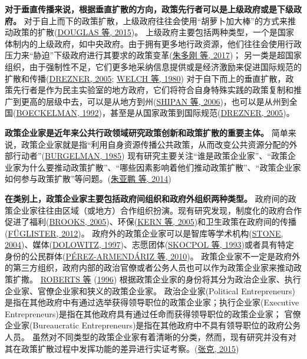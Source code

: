 \documentclass[
  12pt,
]{ctexart}
\begin{document}
\textbf{对于垂直传播来说，根据垂直扩散的方向，政策先行者可以是上级政府或是下级政府。}
对于自上而下的政策扩散，上级政府往往会使用``胡萝卜加大棒''的方式来推动政策的扩散(\protect\hyperlink{ref-DouglasEtAl2015}{DOUGLAS 等, 2015})。
上级政府主要包括两种类型，一个是国家体制内的上级政府，如中央政府。由于拥有更多地行政资源，他们往往会使用行政压力来``胁迫''下级政府进行其要求的政策变革(\protect\hyperlink{ref-ZhuDuoGangHuZhenJi2017}{朱多刚 等, 2017})；
另一类是超国家组织，由于强制性不足，它们更多地采纳信息提供或是经济激励来促进国际规范的扩散和传播(\protect\hyperlink{ref-Drezner2005}{DREZNER, 2005}; \protect\hyperlink{ref-WelchThompson1980}{WELCH 等, 1980})
对于自下而上的垂直扩散，政策先行者是作为民主实验室的地方政府，它们将符合自身特殊实践的政策复制和推广到更高的层级中去，可以是从地方到州(\protect\hyperlink{ref-ShipanVolden2006}{SHIPAN 等, 2006})，也可以是从州到全国(\protect\hyperlink{ref-Boeckelman1992}{BOECKELMAN, 1992})，甚至是从国家政策到国际规范(\protect\hyperlink{ref-Drezner2005}{DREZNER, 2005})。

\textbf{政策企业家是近年来公共行政领域研究政策创新和政策扩散的重要主体。}
简单来说，政策企业家就是指``利用自身资源传播公共政策，从而改变公共资源分配的外部行动者''(\protect\hyperlink{ref-Burgelman1985}{BURGELMAN, 1985})
现有研究主要关注``谁是政策企业家''、``政策企业家为什么要推动政策扩散''、``哪些因素影响着他们推动政策扩散''、``政策企业家如何参与政策扩散''等问题。(\protect\hyperlink{ref-ZhuYaPengXiaoDiWen2014}{朱亚鹏 等, 2014})

\textbf{在类别上，政策企业家主要包括政府间组织和政府外组织两种类型。}
政府间的政策企业家往往由区域（或地方）合作组织扮演。现有研究发现，制度化的政府合作促进了福利(\protect\hyperlink{ref-Brooks2005}{BROOKS, 2005})、环保(\protect\hyperlink{ref-KernEtAl2005}{KERN 等, 2005})和卫生政策在政府间的传播(\protect\hyperlink{ref-Fuglister2012}{FÜGLISTER, 2012})。
政府外的政策企业家可以是智库等学术机构(\protect\hyperlink{ref-Stone2004}{STONE, 2004})、媒体(\protect\hyperlink{ref-Dolowitz1997}{DOLOWITZ, 1997})、志愿团体(\protect\hyperlink{ref-SkocpolEtAl1993}{SKOCPOL 等, 1993})或者具有特定身份的公民群体(\protect\hyperlink{ref-Perez-ArmendarizCrow2010}{PÉREZ-ARMENDÁRIZ 等, 2010})。
政策企业家不一定是政府外的第三方组织，政府内部的政治官僚或者公务人员也可以作为政策企业家来推动政策扩撒。
\protect\hyperlink{ref-RobertsKing1996}{ROBERTS 等} (\protect\hyperlink{ref-RobertsKing1996}{1996}) 根据政策企业家的身份将其分为政治企业家、执行企业家、官僚企业家和狭义的政策企业家。
政治企业家(Political Entrepreneurs)是指在其他政府中有通过选举获得领导职位的政策企业家；执行企业家(Executive Entrepreneurs)是指在其他政府具有通过任命而获得领导职位的政策企业家；
官僚企业家(Bureaucratic Entrepreneurs)是指在其他政府中不具有领导职位的政府公务人员。
虽然对不同类型的政策企业家有着清晰的分类，然而，现有研究并没有对其在政策扩散过程中发挥功能的差异进行实证考察。(\protect\hyperlink{ref-ZhangKe2015}{张克, 2015})
\end{document}
